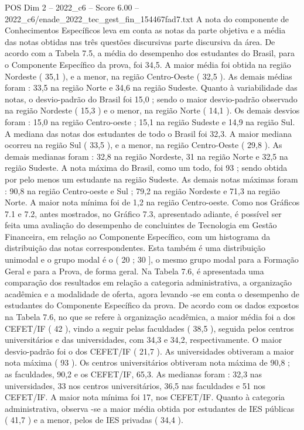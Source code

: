 \begin{textsample}{POS Dim 2 – 2022\_c6 – Score 6.00 – 2022\_c6/enade\_2022\_tec\_gest\_fin\_154467fad7.txt}
A nota do componente de Conhecimentos Específicos leva em conta as notas da parte objetiva e a média das notas obtidas nas três questões discursivas parte discursiva da área.
De acordo com a Tabela 7.5, a média do desempenho dos estudantes do Brasil, para o Componente Específico da prova, foi 34,5.
A maior média foi obtida na região Nordeste ( 35,1 ), e a menor, na região Centro-Oeste ( 32,5 ).
As demais médias foram : 33,5 na região Norte e 34,6 na região Sudeste.
Quanto à variabilidade das notas, o desvio-padrão do Brasil foi 15,0 ; sendo o maior desvio-padrão observado na região Nordeste ( 15,3 ) e o menor, na região Norte ( 14,1 ).
Os demais desvios foram : 15,0 na região Centro-oeste ; 15,1 na região Sudeste e 14,9 na região Sul.
A mediana das notas dos estudantes de todo o Brasil foi 32,3.
A maior mediana ocorreu na região Sul ( 33,5 ), e a menor, na região Centro-Oeste ( 29,8 ).
As demais medianas foram : 32,8 na região Nordeste, 31 na região Norte e 32,5 na região Sudeste.
A nota máxima do Brasil, como um todo, foi 93 ; sendo obtida por pelo menos um estudante na região Sudeste.
As demais notas máximas foram : 90,8 na região Centro-oeste e Sul ; 79,2 na região Nordeste e 71,3 na região Norte.
A maior nota mínima foi de 1,2 na região Centro-oeste.
Como nos Gráficos 7.1 e 7.2, antes mostrados, no Gráfico 7.3, apresentado adiante, é possível ser feita uma avaliação do desempenho de concluintes de Tecnologia em Gestão Financeira, em relação ao Componente Específico, com um histograma da distribuição das notas correspondentes.
Esta também é uma distribuição unimodal e o grupo modal é o ( 20 ; 30 ], o mesmo grupo modal para a Formação Geral e para a Prova, de forma geral.
Na Tabela 7.6, é apresentada uma comparação dos resultados em relação a categoria administrativa, a organização acadêmica e a modalidade de oferta, agora levando -se em conta o desempenho de estudantes do Componente Específico da prova.
De acordo com os dados expostos na Tabela 7.6, no que se refere à organização acadêmica, a maior média foi a dos CEFET/IF ( 42 ), vindo a seguir pelas faculdades ( 38,5 ), seguida pelos centros universitários e das universidades, com 34,3 e 34,2, respectivamente.
O maior desvio-padrão foi o dos CEFET/IF ( 21,7 ).
As universidades obtiveram a maior nota máxima ( 93 ).
Os centros universitários obtiveram nota máxima de 90,8 ; as faculdades, 90,2 e os CEFET/IF, 65,3.
As medianas foram : 32,3 nas universidades, 33 nos centros universitários, 36,5 nas faculdades e 51 nos CEFET/IF.
A maior nota mínima foi 17, nos CEFET/IF.
Quanto à categoria administrativa, observa -se a maior média obtida por estudantes de IES públicas ( 41,7 ) e a menor, pelos de IES privadas ( 34,4 ).

\end{textsample}
